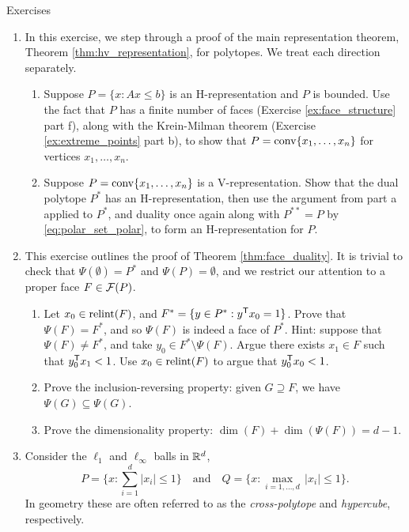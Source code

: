 \begin{xcb}{Exercises}
\begin{enumerate}[label=\thechapter.\arabic*]
\item \label{ex:hv_representation_dual}
  In this exercise, we step through a proof of the main representation theorem,
  Theorem \ref{thm:hv_representation}, for polytopes. We treat each direction 
  separately. 

\begin{enumerate}[label=\alph*.]
\item Suppose $P = \{x : Ax \leq b\}$ is an H-representation and $P$ is
  bounded. Use the fact that $P$ has a finite number of faces (Exercise
  \ref{ex:face_structure} part f), along with the Krein-Milman theorem
  (Exercise \ref{ex:extreme_points} part b), to show that $P =
  \operatorname{conv}\{x_1,\dots,x_n\}$ for vertices $x_1,\dots,x_n$.

\item Suppose $P = \operatorname{conv}\{x_1,\dots,x_n\}$ is a V-representation. Show that the
  dual polytope $P^*$ has an H-representation, then use the argument from part a
  applied to $P^*$, and duality once again along with $P^{**} = P$ by
  \eqref{eq:polar_set_polar}, to form an H-representation for $P$.    
\end{enumerate}

\item \label{ex:face_duality}
  This exercise outlines the proof of Theorem \ref{thm:face_duality}. It is
  trivial to check that $\Psi(\emptyset) = P^*$ and $\Psi(P) = \emptyset$, and
  we restrict our attention to a proper face $F \in \mathcal{F}(P)$.  


\begin{enumerate}[label=\alph*.]
\item Let $x_0 \in \operatorname{relint}(F)$, and $F^* = \{ y \in P^* : y^{\mathsf{T}} x_0 = 1 \}$.
  Prove that $\Psi(F) = F^*$, and so $\Psi(F)$ is indeed a face of
  $P^*$. Hint: suppose that $\Psi(F) \not= F^*$, and take $y_0 \in F^* \setminus
  \Psi(F)$. Argue there exists $x_1 \in F$ such that $y_0^{\mathsf{T}} x_1 < 1$. Use $x_0
  \in \operatorname{relint}(F)$ to argue that $y_0^{\mathsf{T}} x_0 < 1$. 

\item Prove the inclusion-reversing property: given $G \supseteq F$, we have
  $\Psi(G) \subseteq \Psi(G)$.  

\item Prove the dimensionality property: $\dim(F) + \dim(\Psi(F)) = d-1$.  
\end{enumerate}

\item \label{ex:l1_linf_ball_duality}
  Consider the $\ell_1$ and $\ell_\infty$ balls in $\mathbb{R}^d$,
  \[
  P = \bigg\{ x : \sum_{i=1}^d |x_i| \leq 1 \bigg\} \quad \text{and} \quad 
  Q = \bigg\{ x : \max_{i=1,\dots,d} \, |x_i| \leq 1 \bigg\}. 
  \]
  In geometry these are often referred to as the \emph{cross-polytope} and
  \emph{hypercube}, respectively.  


\end{enumerate}
\end{xcb}
